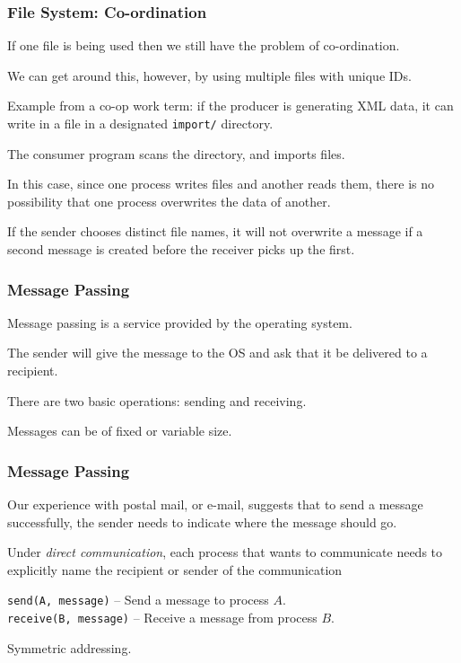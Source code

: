 \begin{frame}
\frametitle{File System: Co-ordination}

If one file is being used then we still have the problem of co-ordination.

We can get around this, however, by using multiple files with unique IDs. 

Example from a co-op work term: if the producer is generating XML data, it can write in a file in a designated \texttt{import/} directory. 

The consumer program scans the directory, and imports files.

In this case, since one process writes files and another reads them, there is no possibility that one process overwrites the data of another. 

If the sender chooses distinct file names, it will not overwrite a message if a second message is created before the receiver picks up the first.

\end{frame}

\begin{frame}
\frametitle{Message Passing}

Message passing is a service provided by the operating system.

The sender will give the message to the OS and ask that it be delivered to a recipient.

  There are two basic operations: sending and receiving. 
  
  Messages can be of fixed or variable size.


\end{frame}

\begin{frame}
\frametitle{Message Passing}

Our experience with postal mail, or e-mail, suggests that to send a message successfully, the sender needs to indicate where the message should go. 

Under \textit{direct communication}, each process that wants to communicate needs to explicitly name the recipient or sender of the communication


\texttt{send(A, message)} -- Send a message to process $A$.\\
\texttt{receive(B, message)} -- Receive a message from process $B$.

Symmetric addressing.

\end{frame}

